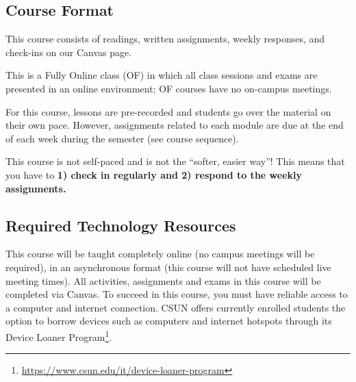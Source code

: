 \documentclass[
  letterpaper,
  DIV=11,
  numbers=noendperiod,
  oneside]{scrartcl}
\DeclareRobustCommand{\href}[2]{#2\footnote{\url{#1}}}
\begin{document}
\hypertarget{course-format}{%
\subsection{Course Format}\label{course-format}}

This course consists of readings, written assignments, weekly responses,
and check-ins on our Canvas page.

This is a Fully Online class (OF) in which all class sessions and exams
are presented in an online environment; OF courses have no on-campus
meetings.

For this course, lessons are pre-recorded and students go over the
material on their own pace. However, assignments related to each module
are due at the end of each week during the semester (see course
sequence).


\begin{tcolorbox}[enhanced jigsaw, breakable, colbacktitle=quarto-callout-warning-color!10!white, colframe=quarto-callout-warning-color-frame, opacitybacktitle=0.6, title=\textcolor{quarto-callout-warning-color}{\faExclamationTriangle}\hspace{0.5em}{Warning}, opacityback=0, colback=white, bottomrule=.15mm, toprule=.15mm, left=2mm, rightrule=.15mm, toptitle=1mm, titlerule=0mm, arc=.35mm, bottomtitle=1mm, leftrule=.75mm, coltitle=black]
This course is not self-paced and is not the ``softer, easier way''!
This means that you have to \textbf{1) check in regularly and 2) respond
to the weekly assignments.}
\end{tcolorbox}

\hypertarget{sec-required-technology-resources}{%
\subsection{Required Technology
Resources}\label{sec-required-technology-resources}}

This course will be taught completely online (no campus meetings will be
required), in an asynchronous format (this course will not have
scheduled live meeting times). All activities, assignments and exams in
this course will be completed via Canvas. To succeed in this course, you
must have reliable access to a computer and internet connection. CSUN
offers currently enrolled students the option to borrow devices such as
computers and internet hotspots through its
\href{https://www.csun.edu/it/device-loaner-program}{Device Loaner
Program}.
\end{document}
